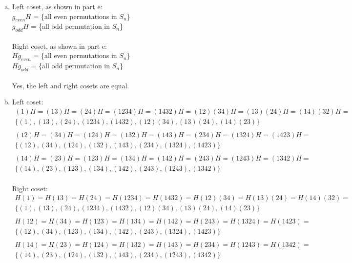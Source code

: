 \begin{enumerate}[(a)]
\item
Left coset, as shown in part e:
\\
$g_{even}H$ = \{all even permutations in $S_n$\}
\\
$g_{odd}H$ = \{all odd permutation in $S_n$\} 
\\
\\
Right coset, as shown in part e:
\\
$Hg_{even}$ = \{all even permutations in $S_n$\}
\\
$Hg_{odd}$ = \{all odd permutation in $S_n$\} 
\\
\\
Yes, the left and right cosets are equal.

\item
Left coset:
\begin{gather*}
(1)H = (13)H = (24)H = (1234)H = (1432)H =  (12)(34)H = (13)(24)H = (14)(32)H = 
\\
\{(1), (13), (24), (1234), (1432), (12)(34), (13)(24), (14)(23)\}
\\
\\
(12)H = (34)H = (124)H = (132)H = (143)H = (234)H = (1324)H = (1423)H = 
\\
\{(12), (34), (124), (132), (143), (234), (1324), (1423)\}
\\
\\
(14)H = (23)H = (123)H = (134)H = (142)H = (243)H = (1243)H = (1342)H = 
\\
\{(14), (23), (123), (134), (142), (243), (1243), (1342)\}
\end{gather*}
\\
Right coset:
\begin{gather*}
H(1) = H(13) = H(24) = H(1234) = H(1432) =  H(12)(34) = H(13)(24) = H(14)(32) = 
\\
\{(1), (13), (24), (1234), (1432), (12)(34), (13)(24), (14)(23)\}
\\
\\
H(12) = H(34) = H(123) = H(134) = H(142)  = H(243) = H(1324) = H(1423) = 
\\
\{(12), (34), (123), (134), (142), (243), (1324), (1423)\}
\\
\\
H(14) = H(23) = H(124) = H(132) = H(143)  = H(234) = H(1243) = H(1342) = 
\\
\{(14), (23), (124), (132), (143), (234), (1243), (1342)\}
\end{gather*}


\end{enumerate}
